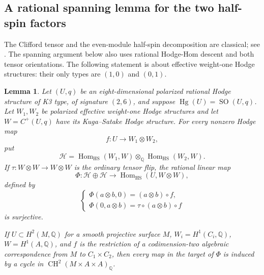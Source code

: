 \documentclass[11pt]{amsart}
\newcommand{\Q}{\mathbb Q}
\DeclareMathOperator{\CH}{CH}
\DeclareMathOperator{\Hg}{Hg}
\DeclareMathOperator{\Hom}{Hom}
\DeclareMathOperator{\SO}{SO}
\newtheorem{lemma}[theorem]{Lemma}
\theoremstyle{definition}
\theoremstyle{remark}
\numberwithin{equation}{section}
\begin{document}
\subsection{A rational spanning lemma for the two half-spin factors}

The Clifford tensor and the even-module half-spin decomposition are
classical; see \cite[Proposition~6.3 and Example~6.6]{VanGeemenKS}.
The spanning argument below also uses rational Hodge-Hom descent and
both tensor orientations.
The following statement is about effective weight-one Hodge
structures: their only types are $(1,0)$ and $(0,1)$.

\begin{lemma}\label{final:spin}
Let $(U,q)$ be an eight-dimensional polarized rational Hodge structure
of K3 type, of signature $(2,6)$, and suppose
$\Hg(U)=\SO(U,q)$.  Let $W_1,W_2$ be polarized effective weight-one
Hodge structures and let $W=C^+(U,q)$ have its Kuga--Satake Hodge
structure.  For every nonzero Hodge map
\[
 f:U\longrightarrow W_1\otimes W_2,
\]
put
\[
 \mathcal H=\Hom_{\mathrm{HS}}(W_1,W)\otimes_{\Q}
       \Hom_{\mathrm{HS}}(W_2,W).
\]
If $\tau:W\otimes W\to W\otimes W$ is the ordinary tensor flip, the
rational linear map
\[
 \Phi:\mathcal H\oplus\mathcal H\longrightarrow
       \Hom_{\mathrm{HS}}(U,W\otimes W),
\]
defined by
\[
 \begin{cases}
 \Phi(a\otimes b,0)=(a\otimes b)\circ f,\\
 \Phi(0,a\otimes b)=\tau\circ(a\otimes b)\circ f
 \end{cases}
\]
is surjective.

If $U\subset H^2(M,\Q)$ for a smooth projective surface $M$,
$W_i=H^1(C_i,\Q)$, $W=H^1(A,\Q)$, and $f$ is the restriction of a
codimension-two algebraic correspondence from $M$ to $C_1\times C_2$,
then every map in the target of $\Phi$ is induced by a cycle in
$\CH^2(M\times A\times A)_\Q$.
\end{lemma}
\end{document}

